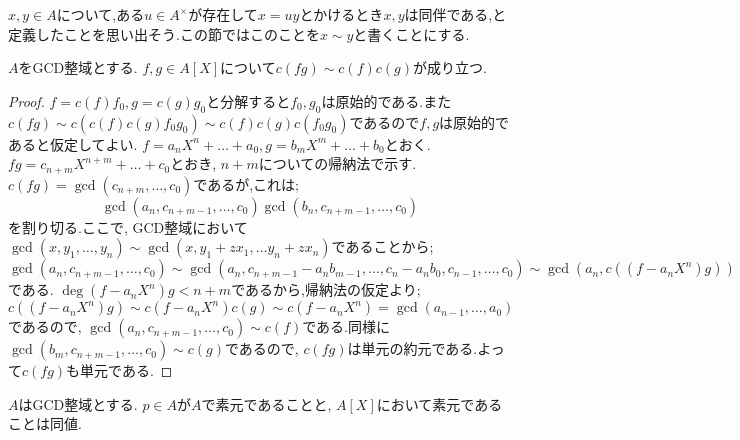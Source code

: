 $x,y\in A$について,ある$u\in A^\times$が存在して$x=uy$とかけるとき$x,y$は同伴である,と定義したことを思い出そう.この節ではこのことを$x\sim y$と書くことにする.
\begin{lem}[Gaussの補題]
	$A$をGCD整域とする. $f,g\in A[X]$について$c(fg)\sim c(f)c(g)$が成り立つ.
\end{lem}

\begin{proof}
	$f=c(f)f_0, g=c(g)g_0$と分解すると$f_0,g_0$は原始的である.また$c(fg)\sim c(c(f)c(g)f_0g_0)\sim c(f)c(g)c(f_0g_0)$であるので$f,g$は原始的であると仮定してよい. $f=a_nX^n+\dots+a_0,g=b_mX^m+\dots+b_0$とおく. $fg=c_{n+m}X^{n+m}+\dots+c_0$とおき, $n+m$についての帰納法で示す. $c(fg)=\gcd(c_{n+m},\dots,c_0)$であるが,これは;
	\[\gcd(a_n,c_{n+m-1},\dots, c_0)\gcd(b_n,c_{n+m-1},\dots,c_0)\]
	を割り切る.ここで, GCD整域において$\gcd(x,y_1,\dots,y_n)\sim\gcd(x,y_1+zx_1,\dots y_n+zx_n)$であることから;
	\[\gcd(a_n,c_{n+m-1},\dots,c_0)\sim\gcd(a_n,c_{n+m-1}-a_nb_{m-1},\dots,c_n-a_nb_0,c_{n-1},\dots,c_0)\sim\gcd(a_n, c((f-a_nX^n)g))\]
	である. $\deg(f-a_nX^n)g<n+m$であるから,帰納法の仮定より;
	\[c((f-a_nX^n)g)\sim c(f-a_nX^n)c(g)\sim c(f-a_nX^n)=\gcd(a_{n-1},\dots,a_0)\]
	であるので, $\gcd(a_n,c_{n+m-1},\dots,c_0)\sim c(f)$である.同様に$\gcd(b_m,c_{n+m-1},\dots,c_0)\sim c(g)$であるので, $c(fg)$は単元の約元である.よって$c(fg)$も単元である.
\end{proof}

%

\begin{prop}
	$A$はGCD整域とする. $p\in A$が$A$で素元であることと, $A[X]$において素元であることは同値.
\end{prop}

